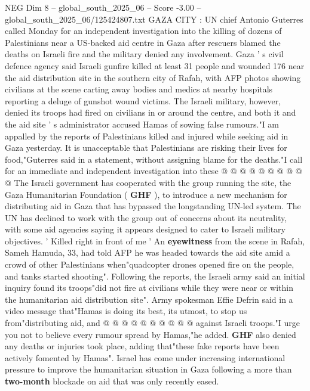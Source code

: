 \begin{textsample}{NEG Dim 8 – global\_south\_2025\_06 – Score -3.00 – global\_south\_2025\_06/125424807.txt}  \label{ex:f8_neg_032}
GAZA CITY : UN chief Antonio Guterres called Monday for an independent investigation into the killing of dozens of Palestinians near a US-backed aid centre in Gaza after rescuers blamed the deaths on Israeli fire and the military denied any involvement.
Gaza ' s civil defence agency said Israeli gunfire killed at least 31 people and wounded 176 near the aid distribution site in the southern city of Rafah, with AFP photos showing civilians at the scene carting away bodies and medics at nearby hospitals reporting a deluge of gunshot wound victims.
The Israeli military, however, denied its troops had fired on civilians in or around the centre, and both it and the aid site ' s administrator accused Hamas of sowing false rumours."I am appalled by the reports of Palestinians killed and injured while seeking aid in Gaza yesterday.
It is unacceptable that Palestinians are risking their lives for food,"Guterres said in a statement, without assigning blame for the deaths."I call for an immediate and independent investigation into these @ @ @ @ @ @ @ @ @ @ The Israeli government has cooperated with the group running the site, the Gaza Humanitarian Foundation ( \textbf{GHF} ), to introduce a new mechanism for distributing aid in Gaza that has bypassed the longstanding UN-led system.
The UN has declined to work with the group out of concerns about its neutrality, with some aid agencies saying it appears designed to cater to Israeli military objectives. ' Killed right in front of me ' An \textbf{eyewitness} from the scene in Rafah, Sameh Hamuda, 33, had told AFP he was headed towards the aid site amid a crowd of other Palestinians when"quadcopter drones opened fire on the people, and tanks started shooting".
Following the reports, the Israeli army said an initial inquiry found its troops"did not fire at civilians while they were near or within the humanitarian aid distribution site".
Army spokesman Effie Defrin said in a video message that"Hamas is doing its best, its utmost, to stop us from"distributing aid, and @ @ @ @ @ @ @ @ @ @ against Israeli troops."I urge you not to believe every rumour spread by Hamas,"he added. \textbf{GHF} also denied any deaths or injuries took place, adding that"these fake reports have been actively fomented by Hamas".
Israel has come under increasing international pressure to improve the humanitarian situation in Gaza following a more than \textbf{two-month} blockade on aid that was only recently eased.

\end{textsample}
